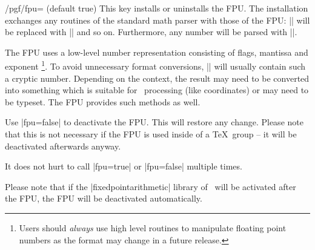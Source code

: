 \begin{key}{/pgf/fpu= (default true)}
    This key installs or uninstalls the FPU. The installation exchanges any
    routines of the standard math parser with those of the FPU: |\pgfmathadd|
    will be replaced with |\pgfmathfloatadd| and so on. Furthermore, any number
    will be parsed with |\pgfmathfloatparsenumber|.
\begin{codeexample}[preamble={\usepgflibrary{fpu}}]
\pgfmathresult
\end{codeexample}
    \noindent The FPU uses a low-level number representation consisting of
    flags, mantissa and exponent%
        \footnote{Users should \emph{always} use high
        level routines to manipulate floating point numbers as the format may
        change in a future release.}.%
    To avoid unnecessary format conversions, |\pgfmathresult| will usually
    contain such a cryptic number. Depending on the context, the result may
    need to be converted into something which is suitable for \pgfname\
    processing (like coordinates) or may need to be typeset. The FPU provides
    such methods as well.


    Use |fpu=false| to deactivate the FPU. This will restore any change. Please
    note that this is not necessary if the FPU is used inside of a \TeX\ group
    -- it will be deactivated afterwards anyway.

    It does not hurt to call |fpu=true| or |fpu=false| multiple times.

    Please note that if the |fixedpointarithmetic| library of \pgfname\ will
    be activated after the FPU, the FPU will be deactivated automatically.
\end{key}

